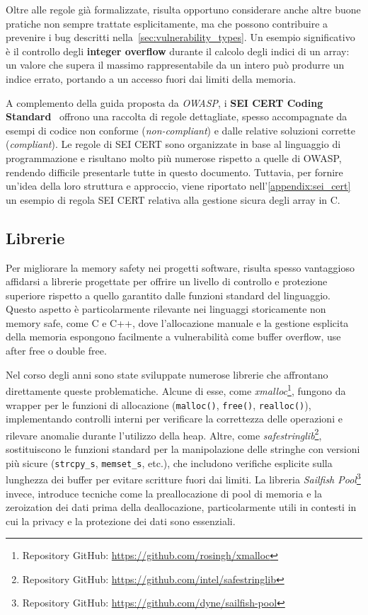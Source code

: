 Oltre alle regole già formalizzate, risulta opportuno considerare anche altre
buone pratiche non sempre trattate esplicitamente, ma che possono contribuire a prevenire
i bug descritti nella~\autoref{sec:vulnerability_types}. Un esempio
significativo è il controllo degli \textbf{integer overflow} durante il calcolo degli
indici di un array: un valore che supera il massimo rappresentabile da un intero
può produrre un indice errato, portando a un accesso fuori dai limiti della memoria.

A complemento della guida proposta da \textit{OWASP}, i \textbf{SEI CERT Coding
Standard}~\cite{cert_coding_standard} offrono una raccolta di regole dettagliate,
spesso accompagnate da esempi di codice non conforme (\textit{non-compliant}) e
dalle relative soluzioni corrette (\textit{compliant}). Le regole di SEI CERT
sono organizzate in base al linguaggio di programmazione e risultano molto più
numerose rispetto a quelle di OWASP, rendendo difficile presentarle tutte in questo
documento. Tuttavia, per fornire un'idea della loro struttura e approccio, viene
riportato nell'\autoref{appendix:sei_cert} un esempio di regola SEI CERT
relativa alla gestione sicura degli array in C.

\subsection{Librerie}
\label{sec:librerie}

Per migliorare la memory safety nei progetti software, risulta spesso
vantaggioso affidarsi a librerie progettate per offrire un livello di controllo
e protezione superiore rispetto a quello garantito dalle funzioni standard del
linguaggio. Questo aspetto è particolarmente rilevante nei linguaggi storicamente
non memory safe, come C e C++, dove l'allocazione manuale e la gestione esplicita
della memoria espongono facilmente a vulnerabilità come buffer overflow, use
after free o double free.

Nel corso degli anni sono state sviluppate numerose librerie che affrontano
direttamente queste problematiche. Alcune di esse, come \textit{xmalloc}\footnote{Repository
GitHub: \url{https://github.com/rosingh/xmalloc}}, fungono da wrapper per le funzioni
di allocazione (\texttt{malloc()}, \texttt{free()}, \texttt{realloc()}), implementando
controlli interni per verificare la correttezza delle operazioni e rilevare anomalie
durante l'utilizzo della heap. Altre, come \textit{safestringlib}\footnote{Repository
GitHub: \url{https://github.com/intel/safestringlib}}, sostituiscono le funzioni
standard per la manipolazione delle stringhe con versioni più sicure (\texttt{strcpy\_s},
\texttt{memset\_s}, etc.), che includono verifiche esplicite sulla lunghezza dei
buffer per evitare scritture fuori dai limiti. La libreria \textit{Sailfish Pool}\footnote{Repository
GitHub: \url{https://github.com/dyne/sailfish-pool}} invece, introduce tecniche
come la preallocazione di pool di memoria e la zeroization dei dati prima della
deallocazione, particolarmente utili in contesti in cui la privacy e la protezione
dei dati sono essenziali.


